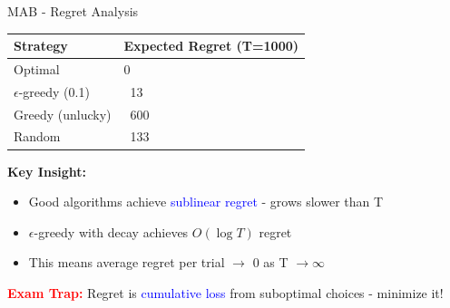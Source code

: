 \documentclass[8pt]{beamer}
\begin{document}
\begin{frame}{MAB - Regret Analysis}
		\begin{tabular}{|p{3cm}|p{3cm}|}
			\hline
			\textbf{Strategy} & \textbf{Expected Regret (T=1000)} \\
			\hline
			Optimal & 0 \\
			\hline
			$\epsilon$-greedy (0.1) & ~13 \\
			\hline
			Greedy (unlucky) & ~600 \\
			\hline
			Random & ~133 \\
			\hline
		\end{tabular}
		
		\textbf{Key Insight:}
		\begin{itemize}
			\item Good algorithms achieve \textcolor{blue}{sublinear regret} - grows slower than T
			\item $\epsilon$-greedy with decay achieves $O(\log T)$ regret
			\item This means average regret per trial $\rightarrow$ 0 as T $\rightarrow \infty$
		\end{itemize}
		
		\textcolor{red}{\textbf{Exam Trap:}} Regret is \textcolor{blue}{cumulative loss} from suboptimal choices - minimize it!
	\end{frame}
	
\end{document}
